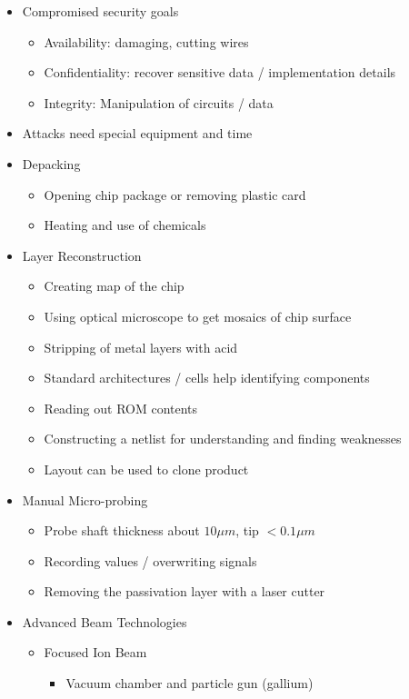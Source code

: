 \documentclass[11pt, paper=a4, twocolumn]{scrartcl}
\begin{document}
		\begin{itemize}
			\item Compromised security goals
				\begin{itemize}
					\item Availability: damaging, cutting wires
					\item Confidentiality: recover sensitive data / implementation details
					\item Integrity: Manipulation of circuits / data
				\end{itemize}
			\item Attacks need special equipment and time
			\item Depacking
				\begin{itemize}
					\item Opening chip package or removing plastic card
					\item Heating and use of chemicals
				\end{itemize}
			\item Layer Reconstruction
				\begin{itemize}
					\item Creating map of the chip
					\item Using optical microscope to get mosaics of chip surface
					\item Stripping of metal layers with acid
					\item Standard architectures / cells help identifying components
					\item Reading out ROM contents
					\item Constructing a netlist for understanding and finding weaknesses
					\item Layout can be used to clone product
				\end{itemize}
			\item Manual Micro-probing
				\begin{itemize}
					\item Probe shaft thickness about $10\mu m$, tip $< 0.1 \mu m$
					\item Recording values / overwriting signals
					\item Removing the passivation layer with a laser cutter
				\end{itemize}
			\item Advanced Beam Technologies
				\begin{itemize}
					\item Focused Ion Beam
						\begin{itemize}
							\item Vacuum chamber and particle gun (gallium)

\end{itemize}
\end{itemize}
\end{itemize}
\end{document}
